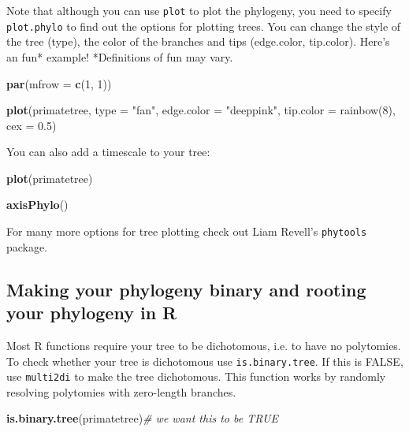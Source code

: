 \documentclass[11pt]{article}
\newcommand{\KeywordTok}[1]{\textcolor[rgb]{0.13,0.29,0.53}{\textbf{{#1}}}}
\newcommand{\DataTypeTok}[1]{\textcolor[rgb]{0.13,0.29,0.53}{{#1}}}
\newcommand{\DecValTok}[1]{\textcolor[rgb]{0.00,0.00,0.81}{{#1}}}
\newcommand{\FloatTok}[1]{\textcolor[rgb]{0.00,0.00,0.81}{{#1}}}
\newcommand{\StringTok}[1]{\textcolor[rgb]{0.31,0.60,0.02}{{#1}}}
\newcommand{\CommentTok}[1]{\textcolor[rgb]{0.56,0.35,0.01}{\textit{{#1}}}}
\newcommand{\NormalTok}[1]{{#1}}
\begin{document}
Note that although you can use \texttt{plot} to plot the phylogeny, you need to specify \texttt{plot.phylo} to find out the options for plotting trees. You can change the style of the tree (type), the color of the branches and tips (edge.color, tip.color). Here’s an fun* example! *Definitions of fun may vary.

\begin{snugshade}
\begin{Highlighting}[]
\KeywordTok{par}\NormalTok{(}\DataTypeTok{mfrow =} \KeywordTok{c}\NormalTok{(}\DecValTok{1}\NormalTok{, }\DecValTok{1}\NormalTok{))}

\KeywordTok{plot}\NormalTok{(primatetree, }\DataTypeTok{type =} \StringTok{"fan"}\NormalTok{, }\DataTypeTok{edge.color =} \StringTok{"deeppink"}\NormalTok{, }\DataTypeTok{tip.color =} 
      \StringTok{rainbow(8)}\NormalTok{, }\DataTypeTok{cex =} \FloatTok{0.5}\NormalTok{)}
\end{Highlighting}
\end{snugshade}

You can also add a timescale to your tree:

\begin{snugshade}
\begin{Highlighting}[]
\KeywordTok{plot}\NormalTok{(primatetree)}

\KeywordTok{axisPhylo}\NormalTok{()}
\end{Highlighting}
\end{snugshade}

For many more options for tree plotting check out Liam Revell's \texttt{phytools} package.

\subsection{Making your phylogeny binary and rooting your phylogeny in R}

Most R functions require your tree to be dichotomous, i.e. to have no polytomies. To check whether your tree is dichotomous use \texttt{is.binary.tree}. If this is FALSE, use \texttt{multi2di} to make the tree dichotomous. This function works by randomly resolving polytomies with zero-length branches.

\begin{snugshade}
\begin{Highlighting}[]
\KeywordTok{is.binary.tree}\NormalTok{(primatetree)}\CommentTok{# we want this to be TRUE}
\end{Highlighting}
\end{snugshade}
\end{document}
